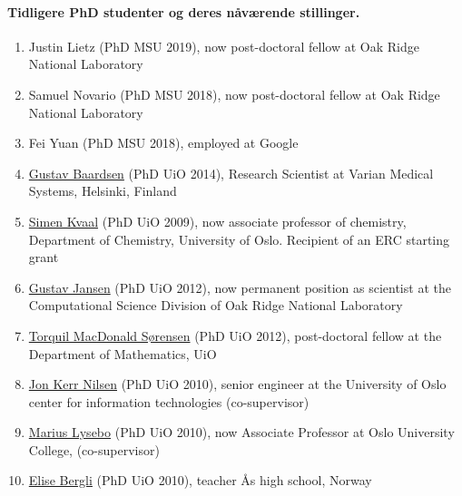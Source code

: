\documentclass[aps,floatfix,preprint]{revtex4-1}
\begin{document}
\noindent
\paragraph*{Tidligere PhD studenter og deres nåværende stillinger.}
\begin{enumerate}
\item Justin Lietz (PhD MSU 2019), now post-doctoral fellow at Oak Ridge National Laboratory

\item Samuel Novario (PhD MSU 2018), now post-doctoral fellow at Oak Ridge National Laboratory

\item Fei Yuan (PhD MSU 2018), employed at Google

\item \href{{https://fi.linkedin.com/in/gustav-baardsen-831a5162}}{Gustav Baardsen} (PhD UiO 2014), Research Scientist at Varian Medical Systems, Helsinki, Finland

\item \href{{http://www.mn.uio.no/kjemi/english/people/aca/simenkv/index.html}}{Simen Kvaal} (PhD UiO 2009), now associate professor of chemistry, Department of Chemistry, University of Oslo. Recipient of an ERC starting grant

\item \href{{https://www.ornl.gov/staff-profile/gustav-r-jansen}}{Gustav Jansen} (PhD UiO 2012), now permanent position as scientist at the Computational Science Division of Oak Ridge National Laboratory  

\item \href{{http://www.mn.uio.no/math/english/people/aca/tmac/}}{Torquil MacDonald Sørensen} (PhD UiO 2012), post-doctoral fellow at the Department of Mathematics, UiO

\item \href{{http://www.usit.uio.no/english/about/organisation/bps/rc/ris/staff/jonkni/}}{Jon Kerr Nilsen} (PhD UiO 2010), senior engineer at the University of Oslo center for information technologies (co-supervisor)

\item \href{{https://www.hioa.no/tilsatt/marlys}}{Marius Lysebo} (PhD UiO 2010), now Associate Professor at Oslo University College, (co-supervisor)

\item \href{{http://www.aas.vgs.no/om-oss/organisasjon/alle-ansatte/}}{Elise Bergli} (PhD UiO 2010), teacher Ås high school, Norway


\end{enumerate}
\end{document}
